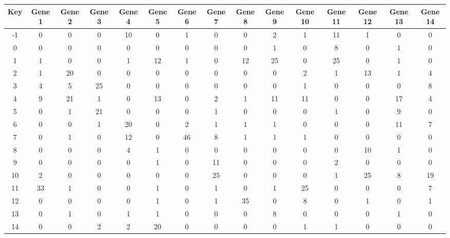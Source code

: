 \begin{tabular}{|c|c|c|c|c|c|c|c|c|c|c|c|c|c|c|}
\hline
Key & Gene 1 & Gene 2 & Gene 3 & Gene 4 & Gene 5 & Gene 6 & Gene 7 & Gene 8 & Gene 9 & Gene 10 & Gene 11 & Gene 12 & Gene 13 & Gene 14 \\
\hline
-1 & 0 & 0 & 0 & 10 & 0 & 1 & 0 & 0 & 2 & 1 & 11 & 1 & 0 & 0 \\
0 & 0 & 0 & 0 & 0 & 0 & 0 & 0 & 0 & 1 & 0 & 8 & 0 & 1 & 0 \\
1 & 1 & 0 & 0 & 1 & 12 & 1 & 0 & 12 & 25 & 0 & 25 & 0 & 1 & 0 \\
2 & 1 & 20 & 0 & 0 & 0 & 0 & 0 & 0 & 0 & 2 & 1 & 13 & 1 & 4 \\
3 & 4 & 5 & 25 & 0 & 0 & 0 & 0 & 0 & 0 & 1 & 0 & 0 & 0 & 8 \\
4 & 9 & 21 & 1 & 0 & 13 & 0 & 2 & 1 & 11 & 11 & 0 & 0 & 17 & 4 \\
5 & 0 & 1 & 21 & 0 & 0 & 0 & 1 & 0 & 0 & 0 & 1 & 0 & 9 & 0 \\
6 & 0 & 0 & 1 & 20 & 0 & 2 & 1 & 1 & 1 & 0 & 0 & 0 & 11 & 7 \\
7 & 0 & 1 & 0 & 12 & 0 & 46 & 8 & 1 & 1 & 1 & 0 & 0 & 0 & 0 \\
8 & 0 & 0 & 0 & 4 & 1 & 0 & 0 & 0 & 0 & 0 & 0 & 10 & 1 & 0 \\
9 & 0 & 0 & 0 & 0 & 1 & 0 & 11 & 0 & 0 & 0 & 2 & 0 & 0 & 0 \\
10 & 2 & 0 & 0 & 0 & 0 & 0 & 25 & 0 & 0 & 0 & 1 & 25 & 8 & 19 \\
11 & 33 & 1 & 0 & 0 & 1 & 0 & 1 & 0 & 1 & 25 & 0 & 0 & 0 & 7 \\
12 & 0 & 0 & 0 & 0 & 1 & 0 & 1 & 35 & 0 & 8 & 0 & 1 & 0 & 1 \\
13 & 0 & 1 & 0 & 1 & 1 & 0 & 0 & 0 & 8 & 0 & 0 & 0 & 1 & 0 \\
14 & 0 & 0 & 2 & 2 & 20 & 0 & 0 & 0 & 0 & 1 & 1 & 0 & 0 & 0 \\
\hline
\end{tabular}